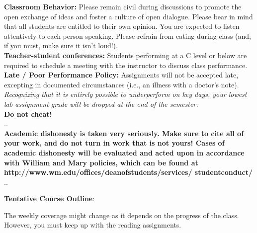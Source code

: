 \documentclass[11pt]{article}
\begin{document}
\textbf {\large Classroom Behavior:} Please remain civil during discussions to promote the open exchange of ideas and foster a culture of open dialogue.  Please bear in mind that all students are entitled to their own opinion.  You are expected to listen attentively to each person speaking.  Please refrain from eating during class (and, if you must, make sure it isn't loud!).\\

\textbf {\large Teacher-student conferences:} Students performing at a C level or below are required to schedule a meeting with the instructor to discuss class performance.\\

\textbf {\large Late / Poor Performance Policy:} Assignments will not be accepted late, excepting in documented circumstances (i.e., an illness with a doctor's note).  \textit{Recognizing that it is entirely possible to underperform on key days, your lowest lab assignment grade will be dropped at the end of the semester.}\\

\vspace{4mm}
\textbf {\LARGE Do not cheat!} \\
.\hrulefill . \\
\textbf{Academic dishonesty is taken very seriously.  Make sure to cite all of your work, and do not turn in work that is not yours!  Cases of academic dishonesty will be evaluated and acted upon in accordance with William and Mary policies, which can be found at http://www.wm.edu/offices/deanofstudents/services/
studentconduct/} \\
.\hrulefill . \\
\vspace{8mm}

\newpage
\textbf {\large Tentative Course Outline}:

The weekly coverage might change as it depends on the progress of the class.  However, you must keep up with the reading assignments.
\end{document}

